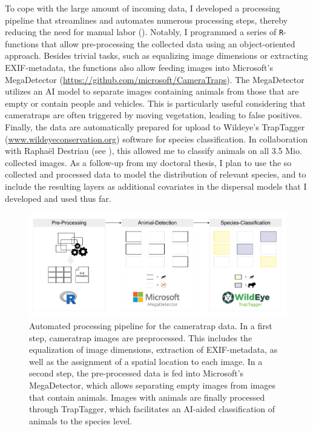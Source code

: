 \documentclass[../FinalThesis.tex]{subfiles}
\begin{document}
To cope with the large amount of incoming data, I developed a processing
pipeline that streamlines and automates numerous processing steps, thereby
reducing the need for manual labor (). Notably, I
programmed a series of \texttt{R}-functions that allow pre-processing the
collected data using an object-oriented approach. Besides trivial tasks, such as
equalizing image dimensions or extracting EXIF-metadata, the functions also
allow feeding images into Microsoft's MegaDetector
(\url{https://github.com/microsoft/CameraTraps}). The MegaDetector utilizes an
AI model to separate images containing animals from those that are empty or
contain people and vehicles. This is particularly useful considering that
cameratraps are often triggered by moving vegetation, leading to false
positives. Finally, the data are automatically prepared for upload to Wildeye's
TrapTagger (\url{www.wildeyeconservation.org}) software for species
classification. In collaboration with Rapha{\"e}l Destriau (see
), this allowed me to classify animals on all 3.5 Mio.
collected images. As a follow-up from my doctoral thesis, I plan to use the so
collected and processed data to model the distribution of relevant species, and
to include the resulting layers as additional covariates in the dispersal models
that I developed and used thus far.

\begin{figure}[htpb]
\begin{center}
  \includegraphics[width = \textwidth]{Figures/CameratrapPipeline}
  \caption{Automated processing pipeline for the cameratrap data. In a first
  step, cameratrap images are preprocessed. This includes the equalization of
  image dimensions, extraction of EXIF-metadata, as well as the assignment of a
  spatial location to each image. In a second step, the pre-processed data is
  fed into Microsoft's MegaDetector, which allows separating empty images from
  images that contain animals. Images with animals are finally processed through
  TrapTagger, which facilitates an AI-aided classification of animals to the
  species level.}
  \label{CameratrapPipeline}
\end{center}
\end{figure}
\end{document}
